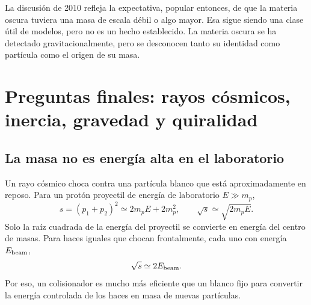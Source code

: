 La discusión de 2010 refleja la expectativa, popular entonces, de que la materia oscura tuviera una masa de escala débil o algo mayor. Esa sigue siendo una clase útil de modelos, pero no es un hecho establecido. La materia oscura se ha detectado gravitacionalmente, pero se desconocen tanto su identidad como partícula como el origen de su masa.

\section{Preguntas finales: rayos cósmicos, inercia, gravedad y quiralidad}

\subsection{La masa no es energía alta en el laboratorio}

\begin{classroomqa}
\end{classroomqa}

Un rayo cósmico choca contra una partícula blanco que está aproximadamente en reposo. Para un protón proyectil de energía de laboratorio \(E\gg m_p\),
\begin{equation}
  s=(p_1+p_2)^2
  \simeq2m_pE+2m_p^2,
  \qquad
  \sqrt{s}\simeq\sqrt{2m_pE}.
  \label{eq:l09-fixed-target-s}
\end{equation}
Solo la raíz cuadrada de la energía del proyectil se convierte en energía del centro de masas. Para haces iguales que chocan frontalmente, cada uno con energía \(E_{\rm beam}\),
\begin{equation}
  \sqrt{s}\simeq2E_{\rm beam}.
  \label{eq:l09-collider-s}
\end{equation}
Por eso, un colisionador es mucho más eficiente que un blanco fijo para convertir la energía controlada de los haces en masa de nuevas partículas.

\begin{classroomqa}
\end{classroomqa}


